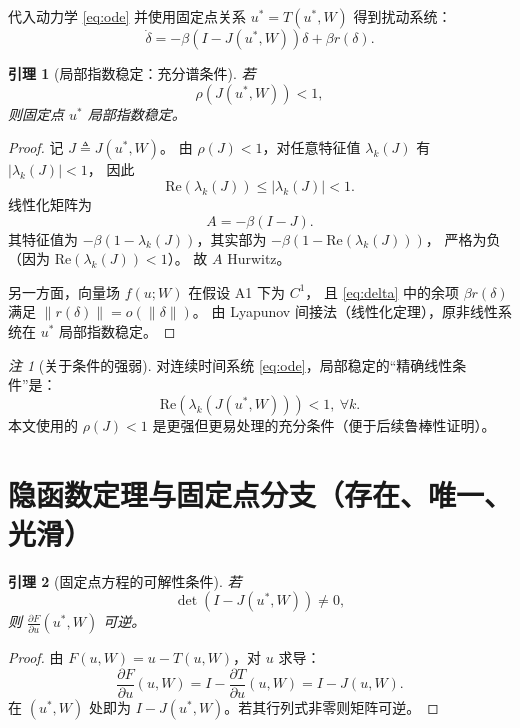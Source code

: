 \documentclass[11pt]{article}
\theoremstyle{plain}
\newtheorem{lemma}{引理}
\theoremstyle{remark}
\newtheorem{remark}{注}
\begin{document}
代入动力学 \eqref{eq:ode} 并使用固定点关系 $u^*=T(u^*,W)$ 得到扰动系统：
\begin{equation}\label{eq:delta}
\dot \delta
= -\beta(I-J(u^*,W))\delta + \beta r(\delta).
\end{equation}

\begin{lemma}[局部指数稳定：充分谱条件]\label{lem:localexp}
若
\begin{equation}\label{eq:sufficient}
\rho(J(u^*,W))<1,
\end{equation}
则固定点 $u^*$ 局部指数稳定。
\end{lemma}

\begin{proof}
记 $J\triangleq J(u^*,W)$。
由 $\rho(J)<1$，对任意特征值 $\lambda_k(J)$ 有 $|\lambda_k(J)|<1$，
因此
\[
\mathrm{Re}(\lambda_k(J))\le |\lambda_k(J)|<1.
\]
线性化矩阵为
\[
A=-\beta(I-J).
\]
其特征值为 $-\beta(1-\lambda_k(J))$，其实部为 $-\beta(1-\mathrm{Re}(\lambda_k(J)))$，
严格为负（因为 $\mathrm{Re}(\lambda_k(J))<1$）。
故 $A$ Hurwitz。

另一方面，向量场 $f(u;W)$ 在假设 A1 下为 $C^1$，
且 \eqref{eq:delta} 中的余项 $\beta r(\delta)$ 满足 $\|r(\delta)\|=o(\|\delta\|)$。
由 Lyapunov 间接法（线性化定理），原非线性系统在 $u^*$ 局部指数稳定。
\end{proof}

\begin{remark}[关于条件的强弱]
对连续时间系统 \eqref{eq:ode}，局部稳定的“精确线性条件”是：
\[
\mathrm{Re}(\lambda_k(J(u^*,W)))<1,\ \forall k.
\]
本文使用的 $\rho(J)<1$ 是更强但更易处理的充分条件（便于后续鲁棒性证明）。
\end{remark}

\section{隐函数定理与固定点分支（存在、唯一、光滑）}

\begin{lemma}[固定点方程的可解性条件]\label{lem:invert}
若
\begin{equation}\label{eq:detcond}
\det(I-J(u^*,W))\neq 0,
\end{equation}
则 $\frac{\partial F}{\partial u}(u^*,W)$ 可逆。
\end{lemma}

\begin{proof}
由 $F(u,W)=u-T(u,W)$，对 $u$ 求导：
\[
\frac{\partial F}{\partial u}(u,W)=I-\frac{\partial T}{\partial u}(u,W)=I-J(u,W).
\]
在 $(u^*,W)$ 处即为 $I-J(u^*,W)$。若其行列式非零则矩阵可逆。
\end{proof}
\end{document}
